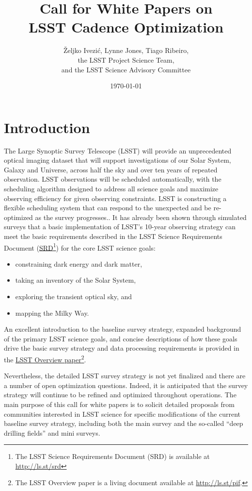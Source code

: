 \documentclass[DM,lsstdraft,toc,usenatbib]{lsstdoc}
\title[Call for LSST Cadence White Papers]{Call for White Papers on \\ LSST Cadence Optimization}
\author{\v{Z}eljko Ivezi\'{c}, Lynne Jones, Tiago Ribeiro, \\
                 the LSST Project Science Team, \\
                 and  the LSST Science Advisory Committee}
\date{\today}
\begin{document}
\maketitle


\section{Introduction} 

The Large Synoptic Survey Telescope (LSST) will provide an unprecedented optical 
imaging dataset that will support investigations of our Solar System, Galaxy and Universe, 
across half the sky and over ten years of repeated observation. LSST observations will be
scheduled automatically, with the scheduling algorithm designed to address all science goals 
and maximize observing efficiency for given observing constraints. LSST is constructing a 
flexible scheduling system that can respond to the unexpected and be re-optimized as the survey progresses.. 
It has already been shown through simulated surveys that a basic implementation of LSST's 
10-year observing strategy can meet the basic requirements
described in the LSST Science Requirements Document (\href{http://ls.st/srd}{SRD}\footnote{The LSST Science 
Requirements Document (SRD) is available at \href{http://ls.st/srd}{http://ls.st/srd}})
for the core LSST science goals:
\begin{itemize}
\item constraining dark energy and dark matter,
\item taking an inventory of the Solar System,
\item exploring the transient optical sky, and
\item mapping the Milky Way.
\end{itemize}
An excellent introduction to the baseline survey strategy, expanded background of the primary LSST science 
goals, and concise descriptions of how these goals drive the basic survey strategy and data processing
requirements is provided in the \href{http://ls.st/pif}{LSST Overview paper}\footnote{The LSST Overview 
paper is a living document available at \href{http://ls.st/pif}{http://ls.st/pif}.}.

Nevertheless, the detailed LSST survey strategy is not yet finalized and there
are a number of open optimization questions. Indeed, it is anticipated that the survey strategy 
will continue to be refined and optimized throughout operations. The main purpose of this 
call for white papers is to solicit detailed proposals from communities interested in LSST science
for specific modifications of the current baseline survey strategy, including both the main survey and 
the so-called ``deep drilling fields'' and mini surveys.
\end{document}
